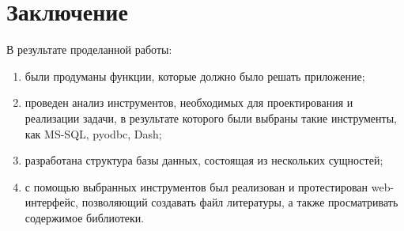 \section*{Заключение}%
В результате проделанной работы:
\begin{enumerate}
	\item были продуманы функции, которые должно было решать приложение;
	\item проведен анализ инструментов, необходимых для проектирования и реализации задачи, в результате которого были выбраны такие инструменты, как MS-SQL, pyodbc, Dash;
	\item разработана структура базы данных, состоящая из нескольких сущностей;
	\item с помощью выбранных инструментов был реализован и протестирован web-интерфейс, позволяющий создавать файл литературы, а также просматривать содержимое библиотеки.
\end{enumerate}



















